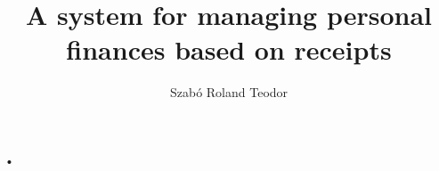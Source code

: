 \documentclass[12pt,a4paper,titlepage,onecolumn,openany,oneside]{report}
\author{Szabó Roland Teodor}
\title{A system for managing personal finances based on receipts}
\begin{document}
•
\end{document}
